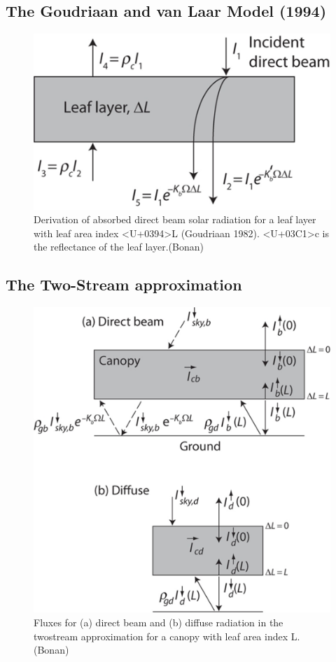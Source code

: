 \documentclass[
  oneside]{book}
\begin{document}
\hypertarget{the-goudriaan-and-van-laar-model-1994}{%
\subsection{The Goudriaan and van Laar Model (1994)}\label{the-goudriaan-and-van-laar-model-1994}}

\begin{figure}

{\centering \includegraphics[width=0.8\linewidth]{figures/chap3/f320_goudriaan} 

}

\caption{ Derivation of absorbed direct beam solar radiation for a leaf layer with leaf area index <U+0394>L (Goudriaan 1982). <U+03C1>c is the reflectance of the leaf layer.(Bonan)}\label{fig:f320}
\end{figure}

\hypertarget{the-two-stream-approximation}{%
\subsection{The Two-Stream approximation}\label{the-two-stream-approximation}}

\begin{figure}

{\centering \includegraphics[width=0.8\linewidth]{figures/chap3/f321_two_stream} 

}

\caption{Fluxes for (a) direct beam and (b) diffuse radiation in the twostream approximation for a canopy with leaf area index L.(Bonan)}\label{fig:f321}
\end{figure}
\end{document}
